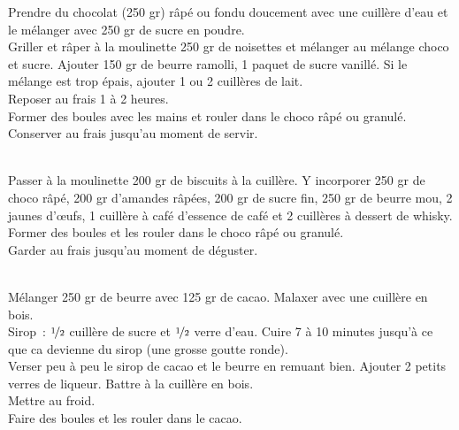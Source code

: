\begin{minipage}[c]{\textwidth}
Prendre du chocolat (250 gr) râpé ou fondu doucement avec une cuillère d’eau et le mélanger avec 250 gr de sucre en poudre.\\
Griller et râper à la moulinette 250 gr de noisettes et mélanger au mélange choco et sucre. Ajouter 150 gr de beurre ramolli, 1 paquet de sucre vanillé. Si le mélange est trop épais, ajouter 1 ou 2 cuillères de lait. \\
Reposer au frais 1 à 2 heures. \\
Former des boules avec les mains et rouler dans le choco râpé ou granulé. \\
Conserver au frais jusqu’au moment de servir.\\
\\

\end{minipage}

\begin{minipage}[c]{\textwidth}
Passer à la moulinette 200 gr de biscuits à la cuillère. Y incorporer 250 gr de choco râpé, 200 gr d’amandes râpées, 200 gr de sucre fin, 250 gr de beurre mou, 2 jaunes d’œufs, 1 cuillère à café d’essence de café et 2 cuillères à dessert de whisky. \\
Former des boules et les rouler dans le choco râpé ou granulé. \\
Garder au frais jusqu’au moment de déguster. \\
\\

\end{minipage}

\begin{minipage}[c]{\textwidth}
Mélanger 250 gr de beurre avec 125 gr de cacao. Malaxer avec une cuillère en bois. \\
Sirop : $\nicefrac{1}{2}$ cuillère de sucre et $\nicefrac{1}{2}$ verre d’eau. Cuire 7 à 10 minutes jusqu’à ce que ca devienne du sirop (une grosse goutte ronde). \\
Verser peu à peu le sirop de cacao et le beurre en remuant bien. Ajouter 2 petits verres de liqueur. Battre à la cuillère en bois.\\
Mettre au froid. \\
Faire des boules et les rouler dans le cacao. \\
\\

\end{minipage}

